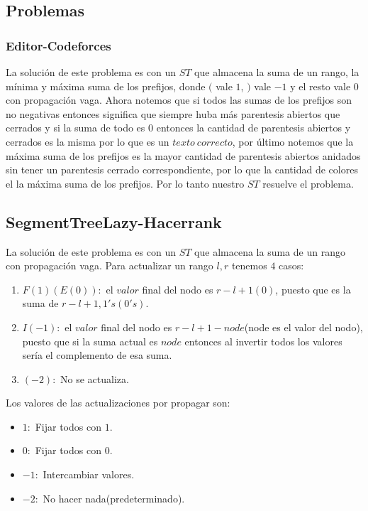\documentclass[letterpaper]{article}
\theoremstyle{definition}
\theoremstyle{lemathm}
\theoremstyle{lemathm}
\theoremstyle{lemathm}
\theoremstyle{lemademthm}
\newcommand{\1}{\mathbbm{1}}
\begin{document}
	\subsection*{Problemas}

	\subsubsection*{Editor-Codeforces}

	La solución de este problema es con un $ST$ que almacena la suma de un rango, la mínima y máxima suma de los prefijos, donde $($ vale $1$, $)$ vale $-1$ y el resto vale $0$ con propagación vaga. Ahora notemos que si todos las sumas de los prefijos son no negativas entonces significa que siempre huba más parentesis abiertos que cerrados y si la suma de todo es $0$ entonces la cantidad de parentesis abiertos y cerrados es la misma por lo que es un $texto\ correcto$, por último notemos que la máxima suma de los prefijos es la mayor cantidad de parentesis abiertos anidados sin tener un parentesis cerrado correspondiente, por lo que la cantidad de colores el la máxima suma de los prefijos. Por lo tanto nuestro $ST$ resuelve el problema.

	\subsection*{SegmentTreeLazy-Hacerrank}
	
	La solución de este problema es con un $ST$ que almacena la suma de un rango con propagación vaga. Para actualizar un rango $l,r$ tenemos $4$ casos:

	\begin{enumerate}
		\item $F(1)(E(0)):$ el $valor$ final del nodo es $r-l+1(0)$, puesto que es la suma de $r-l+1, 1's(0's)$.
		\item $I(-1):$ el $valor$ final del nodo es $r - l + 1 - node$(node es el valor del nodo), puesto que si la suma actual es $node$ entonces al invertir todos los valores sería el complemento de esa suma.
		\item $(-2):$ No se actualiza.
	\end{enumerate}

	Los valores de las actualizaciones por propagar son:

	\begin{itemize}
		\item $1:$ Fijar todos con $1$.
		\item $0:$ Fijar todos con $0$.
		\item $-1:$ Intercambiar valores.
		\item $-2:$ No hacer nada(predeterminado).
	\end{itemize}
	
\end{document}
